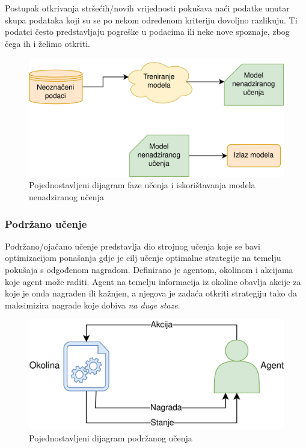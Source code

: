 \documentclass[times, utf8, zavrsni, numeric]{fer}
\begin{document}
Postupak otkrivanja stršećih/novih vrijednosti pokušava naći podatke unutar skupa podataka koji su se po nekom određenom kriteriju dovoljno razlikuju. Ti podatci često predstavljaju pogreške u podacima ili neke nove spoznaje, zbog čega ih i želimo otkriti.

\begin{figure}[H]
    \centering
    \includegraphics[width=\textwidth]{pictures/nenadzirano.png}
    \caption{Pojednostavljeni dijagram faze učenja i iskorištavanja modela nenadziranog učenja}
    \label{nenadzirano_dijagram}
\end{figure}

\subsubsection{Podržano učenje}

Podržano/ojačano učenje predstavlja dio strojnog učenja koje se bavi optimizacijom ponašanja gdje je cilj učenje optimalne strategije na temelju pokušaja s odgođenom nagradom. Definirano je agentom, okolinom i akcijama koje agent može raditi. Agent na temelju informacija iz okoline obavlja akcije za koje je onda nagrađen ili kažnjen, a njegova je zadaća otkriti strategiju tako da maksimizira nagrade koje dobiva \textit{na duge staze}.

\begin{figure}[H]
    \centering
    \includegraphics[width=\textwidth]{pictures/podrzano.png}
    \caption{Pojednostavljeni dijagram podržanog učenja}
    \label{podrzano_dijagram}
\end{figure}
\end{document}

